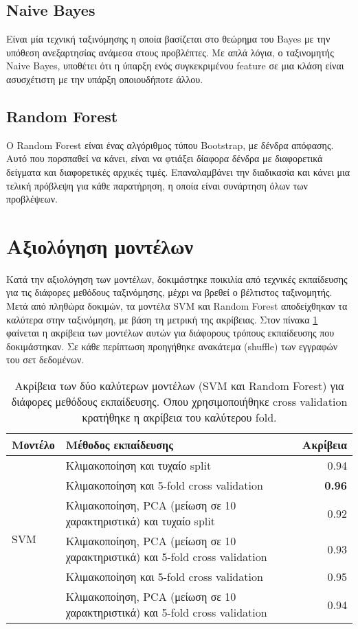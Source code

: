 \subsection{Naive Bayes}

Είναι μία τεχνική ταξινόμησης η οποία βασίζεται στο θεώρημα του Bayes με την υπόθεση ανεξαρτησίας ανάμεσα στους προβλέπτες. Με απλά λόγια, ο ταξινομητής Naive Bayes, υποθέτει ότι η ύπαρξη ενός συγκεκριμένου feature σε μια κλάση είναι ασυσχέτιστη με την υπάρξη οποιουδήποτε άλλου.

\subsection{Random Forest}

O Random Forest είναι ένας αλγόριθμος τύπου Bootstrap, με δένδρα απόφασης. Αυτό που πορσπαθεί να κάνει, είναι να φτιάξει δίαφορα δένδρα με διαφορετικά δείγματα και διαφορετικές αρχικές τιμές. Επαναλαμβάνει την διαδικασία και κάνει μια τελική πρόβλεψη για κάθε παρατήρηση, η οποία είναι συνάρτηση όλων των προβλέψεων.

\section{Αξιολόγηση μοντέλων}

Κατά την αξιολόγηση των μοντέλων, δοκιμάστηκε ποικιλία από τεχνικές εκπαίδευσης για τις διάφορες μεθόδους ταξινόμησης, μέχρι να βρεθεί ο βέλτιστος ταξινομητής. Μετά από πληθώρα δοκιμών, τα μοντέλα SVM και Random Forest αποδείχθηκαν τα καλύτερα στην ταξινόμηση, με βάση τη μετρική της ακρίβειας. Στον πίνακα \ref{table:tab1} φαίνεται η ακρίβεια των μοντέλων αυτών για διάφορους τρόπους εκπαίδευσης που δοκιμάστηκαν. Σε κάθε περίπτωση προηγήθηκε ανακάτεμα (shuffle) των εγγραφών του σετ δεδομένων.


\begin{table}[ht]
	\centering
	\begin{tabular}{@{} l p{9cm} r @{}}
		\toprule
		\textbf{Μοντέλο} & \textbf{Μέθοδος εκπαίδευσης} & \textbf{Ακρίβεια} \\ \midrule
		\multirow[m]{6}{*}{SVM} & Κλιμακοποίηση και τυχαίο split & 0.94 \\
		 & Κλιμακοποίηση και 5-fold cross validation & \textbf{0.96} \\
		 & Κλιμακοποίηση, PCA (μείωση σε 10 χαρακτηριστικά) και τυχαίο split & 0.92 \\
		 & Κλιμακοποίηση, PCA (μείωση σε 10 χαρακτηριστικά) και 5-fold cross validation & 0.93 \\ \midrule
		\multirow[m]{3}{*}{Random Forest} & Κλιμακοποίηση και 5-fold cross validation & 0.95 \\
		 & Κλιμακοποίηση, PCA (μείωση σε 10 χαρακτηριστικά) και 5-fold cross validation & 0.94 \\ \bottomrule
	\end{tabular}
	\caption{Ακρίβεια των δύο καλύτερων μοντέλων (SVM και Random Forest) για διάφορες μεθόδους εκπαίδευσης. \small
	Όπου χρησιμοποιήθηκε cross validation κρατήθηκε η ακρίβεια του καλύτερου fold.}
	\label{table:tab1}
\end{table}


